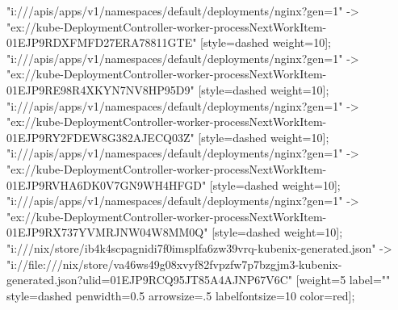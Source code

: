 {"i:///apis/apps/v1/namespaces/default/deployments/nginx?gen=1" -> "ex://kube-DeploymentController-worker-processNextWorkItem-01EJP9RDXFMFD27ERA78811GTE" [style=dashed weight=10];
"i:///apis/apps/v1/namespaces/default/deployments/nginx?gen=1" -> "ex://kube-DeploymentController-worker-processNextWorkItem-01EJP9RE98R4XKYN7NV8HP95D9" [style=dashed weight=10];
"i:///apis/apps/v1/namespaces/default/deployments/nginx?gen=1" -> "ex://kube-DeploymentController-worker-processNextWorkItem-01EJP9RY2FDEW8G382AJECQ03Z" [style=dashed weight=10];
"i:///apis/apps/v1/namespaces/default/deployments/nginx?gen=1" -> "ex://kube-DeploymentController-worker-processNextWorkItem-01EJP9RVHA6DK0V7GN9WH4HFGD" [style=dashed weight=10];
"i:///apis/apps/v1/namespaces/default/deployments/nginx?gen=1" -> "ex://kube-DeploymentController-worker-processNextWorkItem-01EJP9RX737YVMRJNW04W8MM0Q" [style=dashed weight=10];
"i:///nix/store/ib4k4scpagnidi7f0imsplfa6zw39vrq-kubenix-generated.json" -> "i://file:///nix/store/va46ws49g08xvyf82fvpzfw7p7bzgjm3-kubenix-generated.json?ulid=01EJP9RCQ95JT85A4AJNP67V6C" [weight=5 label="" style=dashed penwidth=0.5 arrowsize=.5 labelfontsize=10 color=red];


}